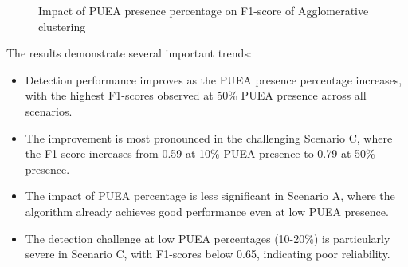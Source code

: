 \begin{figure}[htbp]
    \centering
    \caption{Impact of PUEA presence percentage on F1-score of Agglomerative clustering}
    \label{fig:puea_percentage_impact}
\end{figure}

The results demonstrate several important trends:

\begin{itemize}
    \item Detection performance improves as the PUEA presence percentage increases, with the highest F1-scores observed at 50\% PUEA presence across all scenarios.
    
    \item The improvement is most pronounced in the challenging Scenario C, where the F1-score increases from 0.59 at 10\% PUEA presence to 0.79 at 50\% presence.
    
    \item The impact of PUEA percentage is less significant in Scenario A, where the algorithm already achieves good performance even at low PUEA presence.
    
    \item The detection challenge at low PUEA percentages (10-20\%) is particularly severe in Scenario C, with F1-scores below 0.65, indicating poor reliability.
\end{itemize}

